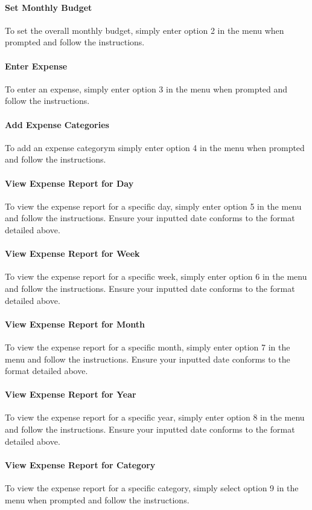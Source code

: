 \documentclass[11pt]{article}
\begin{document}
  \paragraph{Set Monthly Budget}
  To set the overall monthly budget, simply enter option 2 in the menu when prompted and follow the instructions.
  \paragraph{Enter Expense}
  To enter an expense, simply enter option 3 in the menu when prompted and follow the instructions.
  \paragraph{Add Expense Categories}
  To add an expense categorym simply enter option 4 in the menu when prompted and follow the instructions.
  \paragraph{View Expense Report for Day}
  To view the expense report for a specific day, simply enter option 5 in the menu and follow the instructions. Ensure your inputted date conforms to the format detailed above.
  \paragraph{View Expense Report for Week}
  To view the expense report for a specific week, simply enter option 6 in the menu and follow the instructions. Ensure your inputted date conforms to the format detailed above.
  \paragraph{View Expense Report for Month}
  To view the expense report for a specific month, simply enter option 7 in the menu and follow the instructions. Ensure your inputted date conforms to the format detailed above.
  \paragraph{View Expense Report for Year}
  To view the expense report for a specific year, simply enter option 8 in the menu and follow the instructions. Ensure your inputted date conforms to the format detailed above.
  \paragraph{View Expense Report for Category}
  To view the expense report for a specific category, simply select option 9 in the menu when prompted and follow the instructions.
\end{document}
